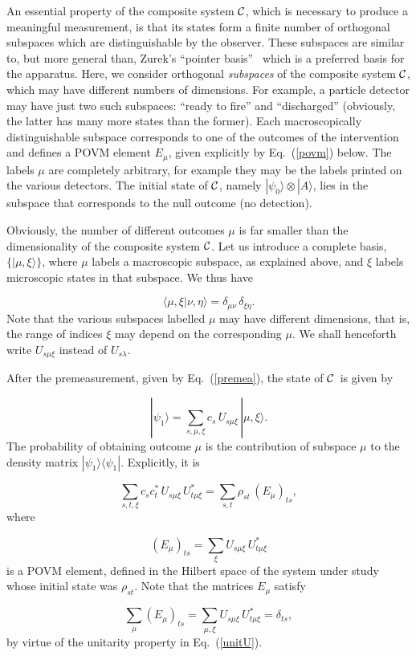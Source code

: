 \documentclass[12pt]{article}
\def\beq{\begin{equation}}
\def\eeq{\end{equation}}
\def\Eq{Eq.~(\ref}
\def\0{\otimes}
\def\6{\langle}
\def\9{\rangle}
\def\cC{$\cal C$}
\begin{document}
An essential property of the composite system \cC, which is necessary to
produce a meaningful measurement, is that its states form a finite
number of orthogonal subspaces which are distinguishable by the
observer. These subspaces are similar to, but more general than, Zurek's
``pointer basis''~\cite{pointer} which is a preferred basis for the
apparatus. Here, we consider ortho\-gonal {\it subspaces\/} of the
composite system \cC, which may have different numbers of dimensions.
For example, a particle detector may have just two such subspaces:
``ready to fire'' and ``discharged'' (obviously, the latter has many
more states than the former). Each macroscopically distinguishable
subspace corresponds to one of the outcomes of the intervention and
defines a POVM element $E_\mu$, given explicitly by \Eq{povm}) below.
The labels $\mu$ are completely arbitrary, for example they may be the
labels printed on the various detectors. The initial state of \cC,
namely $|\psi_0\9\0|A\9$, lies in the subspace that corresponds to the
null outcome (no detection).

Obviously, the number of different outcomes $\mu$ is far smaller than
the dimensionality of the composite system \cC. Let us introduce a
complete basis, $\{|\mu,\xi\9\}$, where $\mu$ labels a macroscopic
subspace, as explained above, and $\xi$ labels microscopic states in
that subspace. We thus have

\beq \6\mu,\xi|\nu,\eta\9=\delta_{\mu\nu}\,\delta_{\xi\eta}.\eeq
Note that the various subspaces labelled $\mu$ may have different
dimensions, that is, the range of indices $\xi$ may depend on the
corresponding $\mu$. We shall henceforth write $U_{s\mu\xi}$ instead of
$U_{s\lambda}$.

After the premeasurement, given by \Eq{premea}), the state of \cC\ is
given by

\beq |\psi_1\9=\sum_{s,\mu,\xi} c_s\,U_{s\mu\xi}\,|\mu,\xi\9.
 \label{psi1} \eeq
The probability of obtaining outcome $\mu$ is the contribution of
subspace $\mu$ to the density matrix $|\psi_1\9\6\psi_1|$. Explicitly,
it is

\beq \sum_{s,t,\xi} c_sc_t^*\,U_{s\mu\xi}\,U^*_{t\mu\xi}=
  \sum_{s,t}\rho_{st}\,(E_\mu)_{ts}, \label{prob}\eeq
where

\beq (E_\mu)_{ts}=\sum_\xi U_{s\mu\xi}\,U^*_{t\mu\xi} \label{povm}\eeq
is a POVM element, defined in the Hilbert space of the system under
study whose initial state was $\rho_{st}$. Note that the matrices
$E_\mu$ satisfy

\beq \sum_\mu(E_\mu)_{ts}=\sum_{\mu,\xi} U_{s\mu\xi}\,U^*_{t\mu\xi}=
 \delta_{ts}, \eeq
by virtue of the unitarity property in \Eq{unitU}).
\end{document}
